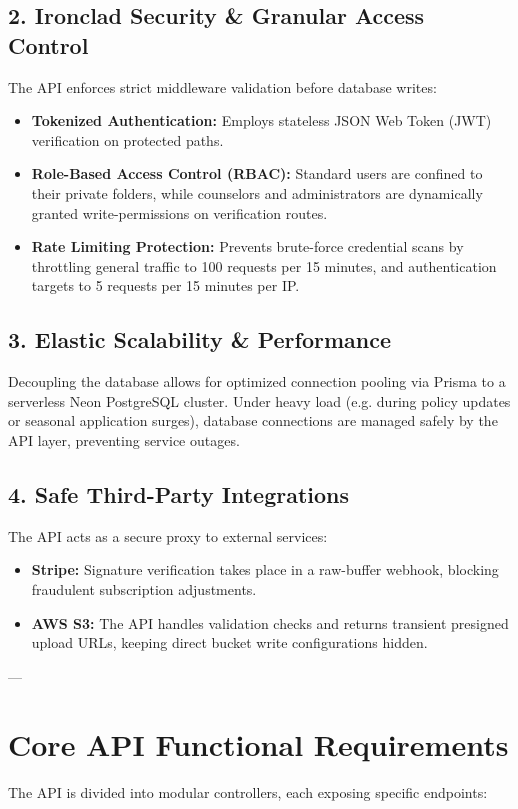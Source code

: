 \documentclass[11pt,a4paper]{article}
\begin{document}
\subsection{2. Ironclad Security & Granular Access Control}
The API enforces strict middleware validation before database writes:
\begin{itemize}
    \item \textbf{Tokenized Authentication:} Employs stateless JSON Web Token (JWT) verification on protected paths.
    \item \textbf{Role-Based Access Control (RBAC):} Standard users are confined to their private folders, while counselors and administrators are dynamically granted write-permissions on verification routes.
    \item \textbf{Rate Limiting Protection:} Prevents brute-force credential scans by throttling general traffic to 100 requests per 15 minutes, and authentication targets to 5 requests per 15 minutes per IP.
\end{itemize}

\subsection{3. Elastic Scalability & Performance}
Decoupling the database allows for optimized connection pooling via Prisma to a serverless Neon PostgreSQL cluster. Under heavy load (e.g. during policy updates or seasonal application surges), database connections are managed safely by the API layer, preventing service outages.

\subsection{4. Safe Third-Party Integrations}
The API acts as a secure proxy to external services:
\begin{itemize}
    \item \textbf{Stripe:} Signature verification takes place in a raw-buffer webhook, blocking fraudulent subscription adjustments.
    \item \textbf{AWS S3:} The API handles validation checks and returns transient presigned upload URLs, keeping direct bucket write configurations hidden.
\end{itemize}

---

\section{Core API Functional Requirements}
The API is divided into modular controllers, each exposing specific endpoints:
\end{document}
